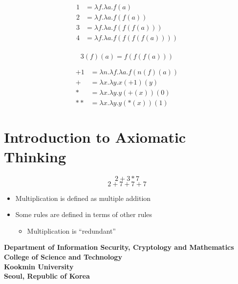 \documentclass[11pt,openany]{article}
\newcommand{\footer}[1]{
\begin{flushright}
	\vspace{2em}
	\vspace{1em}
	\textcolor{TealBlue2}{\small\textbf{#1}}
\end{flushright}
}
\begin{document}
\begin{align*}
	1&=\lambda f.\lambda a.f(a)\\
	2&=\lambda f.\lambda a.f(f(a))\\
	3&=\lambda f.\lambda a.f(f(f(a)))\\
	4&=\lambda f.\lambda a.f(f(f(f(a))))\\
\end{align*}

\[
3(f)(a)=f(f(f(a)))
\]

\begin{align*}
	+1 &= \lambda n.\lambda f.\lambda a. f(n(f)(a))\\
	+ &= \lambda x.\lambda y.x(+1)(y)\\
	* &=\lambda x.\lambda y.y(+(x))(0) \\
	** &=\lambda x.\lambda y.y(*(x))(1)
\end{align*}

\newpage
\section*{Introduction to Axiomatic Thinking}

\[
2+3*7
\]
\[
2+7+7+7
\]
\begin{itemize}
	\item Multiplication is defined as multiple addition
	\item Some rules are defined in terms of other rules
	\begin{itemize}
		\item Multiplication is ``redundant''
	\end{itemize}
\end{itemize}


\newpage
\footer{Department of Information Security, Cryptology and Mathematics\\
	College of Science and Technology\\
	Kookmin University \\
	Seoul, Republic of Korea}

\newpage

%
%
\end{document}
